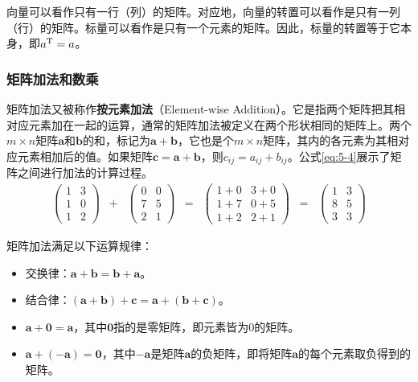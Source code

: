 \parinterval 向量可以看作只有一行（列）的矩阵。对应地，向量的转置可以看作是只有一列（行）的矩阵。标量可以看作是只有一个元素的矩阵。因此，标量的转置等于它本身，即$ a^{\rm T}=a $。


\subsubsection{矩阵加法和数乘}

\parinterval 矩阵加法又被称作{\small\sffamily\bfseries{按元素加法}}（Element-wise Addition）。它是指两个矩阵把其相对应元素加在一起的运算，通常的矩阵加法被定义在两个形状相同的矩阵上。两个$ m\times n $矩阵$ \mathbf a $和$ \mathbf b $的和，标记为$ \mathbf a + \mathbf b $，它也是个$ m\times n $矩阵，其内的各元素为其相对应元素相加后的值。如果矩阵$ \mathbf c = \mathbf a + \mathbf b $，则$ c_{ij} = a_{ij} + b_{ij} $。公式\ref{eq:5-4}展示了矩阵之间进行加法的计算过程。
\begin{eqnarray}
\begin{pmatrix}
   1 & 3\\
   1 & 0\\
   1 & 2
\end{pmatrix}\;\;+\;\;\begin{pmatrix}
   0 & 0\\
   7 & 5\\
   2 & 1
\end{pmatrix}&=&\begin{pmatrix}
   1+0 & 3+0\\
   1+7 & 0+5\\
   1+2 & 2+1
\end{pmatrix}\;\;=\;\;\begin{pmatrix}
   1 & 3\\
   8 & 5\\
   3 & 3
\end{pmatrix}
\label{eq:5-4}
\end{eqnarray}

\parinterval 矩阵加法满足以下运算规律：

\begin{itemize}
\vspace{0.5em}
\item 交换律：$ \mathbf a+\mathbf b = \mathbf b +\mathbf a $。
\vspace{0.5em}
\item 结合律：$ (\mathbf a+\mathbf b)+\mathbf c = \mathbf a+(\mathbf b+\mathbf c) $。
\vspace{0.5em}
\item $ \mathbf a+\mathbf 0=\mathbf a $，其中$ \mathbf 0 $指的是零矩阵，即元素皆为0的矩阵。
\vspace{0.5em}
\item $ \mathbf a+(-\mathbf a)=\mathbf 0 $，其中$ -\mathbf a $是矩阵$ \mathbf a $的负矩阵，即将矩阵$ \mathbf a $的每个元素取负得到的矩阵。
\vspace{0.5em}
\end{itemize}

